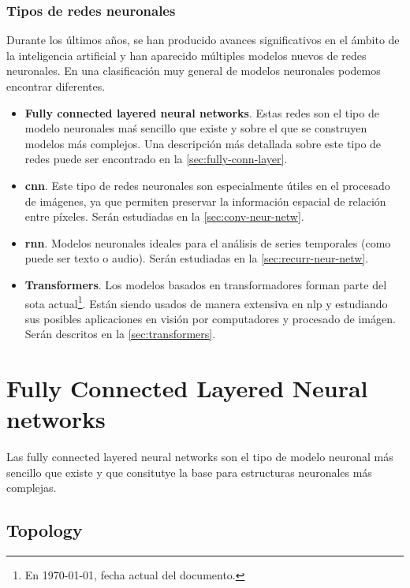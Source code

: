 \subsubsection{Tipos de redes neuronales}
Durante los últimos años, se han producido avances significativos en el ámbito
de la inteligencia artificial y han aparecido múltiples modelos nuevos de redes
neuronales. En una clasificación muy general de modelos neuronales podemos
encontrar diferentes.

\begin{itemize}
  \item \textbf{Fully connected layered neural networks}. Estas redes son el
  tipo de modelo neuronales maś sencillo que existe y sobre el que se
  construyen modelos más complejos. Una descripción más detallada sobre este
  tipo de redes puede ser encontrado en la \vref{sec:fully-conn-layer}.
  \item \textbf{\acl*{cnn}}. Este tipo de redes neuronales son especialmente
  útiles en el procesado de imágenes, ya que permiten preservar la información
  espacial de relación entre píxeles. Serán estudiadas en la
  \vref{sec:conv-neur-netw}.
  \item \textbf{\acl*{rnn}}. Modelos neuronales ideales para el análisis de
  series temporales (como puede ser texto o audio). Serán estudiadas en la
  \vref{sec:recurr-neur-netw}.
  \item \textbf{Transformers}. Los modelos basados en transformadores forman
  parte del \acl{sota} actual\footnote{En \today, fecha actual del
    documento.}. Están siendo usados de manera extensiva en \gls{nlp} y
  estudiando sus posibles aplicaciones en visión por computadores y procesado
  de imágen. Serán descritos en la \vref{sec:transformers}.
\end{itemize}


\section{Fully Connected Layered Neural networks}
\label{sec:fully-conn-layer}

Las fully connected layered neural networks son el tipo de modelo neuronal más
sencillo que existe y que consitutye la base para estructuras neuronales más
complejas.

\subsection{Topology}
\label{sec:topology}

